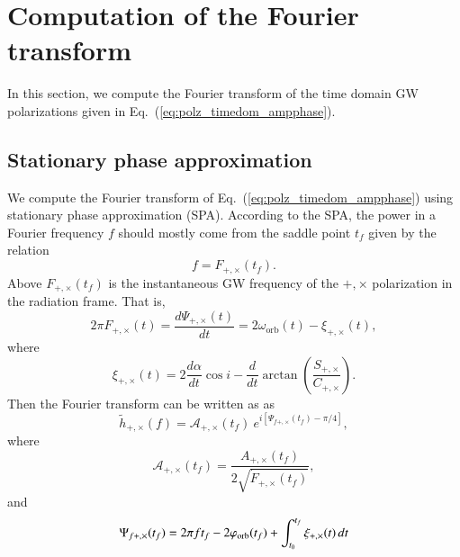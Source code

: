 \documentclass[prd,preprintnumbers,twocolumn,eqsecnum,floatfix,letter]{revtex4}
\begin{document}
\section{Computation of the Fourier transform}

In this section, we compute the Fourier transform of the time domain GW polarizations given in Eq.~(\ref{eq:polz_timedom_ampphase}).

\subsection{Stationary phase approximation}

We compute the Fourier transform of Eq.~(\ref{eq:polz_timedom_ampphase}) using stationary phase approximation (SPA). According to the SPA, the power in a Fourier frequency $f$ should mostly come from the saddle point $t_f$ given by the relation 
%
\begin{equation}
 f = F_{+,\times}(t_f).
 \label{eq:saddle_point}
\end{equation}
%
Above $F_{+,\times}(t_f)$ is the instantaneous GW frequency of the $+,\times$ polarization in the radiation frame. That is, 
\begin{equation}
\label{eq:saddle_point}
2 \pi F_{+,\times}(t) =  \frac{d\Psi_{+,\times}(t)}{dt} = 2 \omega_\mathrm{orb}(t) - \xi_{+,\times}(t), 
\end{equation}
where 
\begin{equation}
\xi_{+,\times}(t) = 2 \frac{d\alpha}{dt} \cos i - \frac{d}{dt} \arctan\left(\frac{S_{+,\times}}{C_{+,\times}}\right).
\end{equation}
% 
Then the Fourier transform can be written as as 
%
\begin{equation}
\tilde{h}_{+,\times}(f) = \mathcal{A}_{+,\times}(t_f) ~ e^{i[\Psi_{f+,\times}(t_f)-\pi/4]},
\end{equation}
where 
\begin{equation}
\label{eq:fourier_ampl}
\mathcal{A}_{+,\times}(t_f) = \frac{A_{+,\times}(t_f)}{2 \sqrt{\dot{F}_{+,\times}(t_f)}},
\end{equation}
and 
\begin{equation}
\label{eq:fourier_phase}
\Psi_{f{+,\times}}(t_f) = 2\pi f t_{f}- 2 \varphi_\mathrm{orb}(t_f) + \int_{t_0}^{t_f} \xi_{+,\times}(t) \, dt 
\end{equation}
\end{document}
